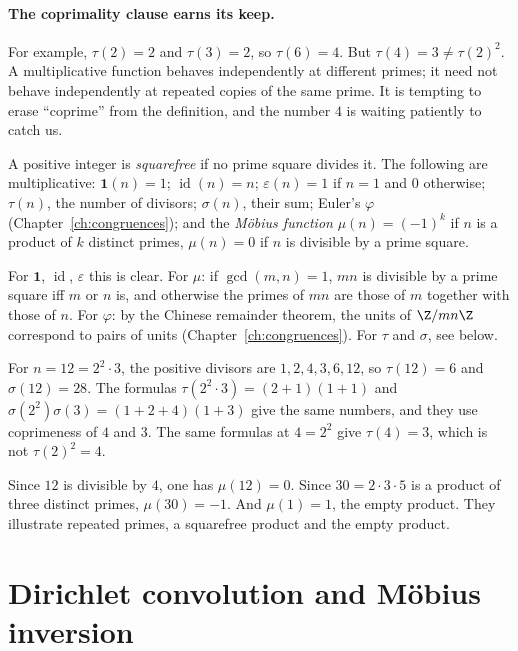 \paragraph{The coprimality clause earns its keep.}
For example, $\tau(2)=2$ and $\tau(3)=2$, so $\tau(6)=4$. But
$\tau(4)=3\ne\tau(2)^2$. A multiplicative function behaves independently at
different primes; it need not behave independently at repeated copies of the
same prime. It is tempting to erase ``coprime'' from the definition, and the
number $4$ is waiting patiently to catch us.

\begin{example}
A positive integer is \emph{squarefree} if no prime square divides it. The following are multiplicative:
$\mathbf 1(n)=1$; $\operatorname{id}(n)=n$; $\varepsilon(n)=1$ if $n=1$ and $0$ otherwise;
$\tau(n)$, the number of divisors; $\sigma(n)$, their sum; Euler's $\varphi$ (Chapter~\ref{ch:congruences});
and the \emph{M\"obius function}\label{sym:mu} $\mu(n)=(-1)^k$ if $n$ is a product of $k$ distinct primes, $\mu(n)=0$ if $n$ is divisible by a prime square.
\end{example}
For $\mathbf 1$, $\operatorname{id}$, $\varepsilon$ this is clear. For $\mu$: if $\gcd(m,n)=1$, $mn$ is divisible by a prime square iff $m$ or $n$ is, and otherwise the primes of $mn$ are those of $m$ together with those of $n$. For $\varphi$: by the Chinese remainder theorem, the units of $\Z/mn\Z$ correspond to pairs of units (Chapter~\ref{ch:congruences}). For $\tau$ and $\sigma$, see below.

\begin{examplex}
For $n=12=2^2\cdot 3$, the positive divisors are $1,2,4,3,6,12$, so $\tau(12)=6$ and $\sigma(12)=28$.
The formulas $\tau(2^2\cdot 3)=(2+1)(1+1)$ and $\sigma(2^2)\sigma(3)=(1+2+4)(1+3)$ give the same numbers, and they use coprimeness of $4$ and $3$.
The same formulas at $4=2^2$ give $\tau(4)=3$, which is not $\tau(2)^2=4$.
\end{examplex}

\begin{examplex}
Since $12$ is divisible by $4$, one has $\mu(12)=0$.
Since $30=2\cdot 3\cdot 5$ is a product of three distinct primes, $\mu(30)=-1$.
And $\mu(1)=1$, the empty product. They illustrate repeated primes, a squarefree product and the empty product.
\end{examplex}

\section{Dirichlet convolution and M\"obius inversion}

